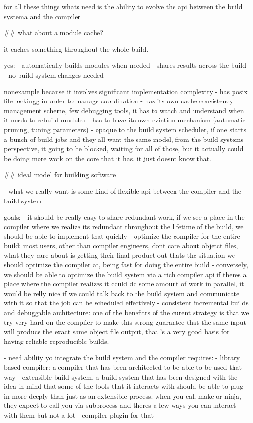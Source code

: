 \documentclass[12pt, a4paper]{report}
\begin{document}
  for all these things whats need is the ability to evolve the api between the build systema and the compiler

## what about a module cache?

  it caches something throughout the whole build.

  yes:
  - automatically builds modules when needed
  - shares results across the build
  - no build system changes needed

  nonexample because it involves significant implementation complexity
  - has posix file lockingg in order to manage coordination
  - has its own cache consistency management scheme, few debugging tools, it has to watch and understand when it needs to rebuild modules
  - has to have its own eviction mechanism (automatic pruning, tuning parameters)
  - opaque to the build system scheduler, if one starts a bunch of build jobs and they all want the same model, from the build systems perspective, it going to be blocked, waiting for all of those, but it actually could be doing more work on the core that it has, it just doesnt know that.

## ideal model for building software

  - what we really want is some kind of flexible api between the compiler and the build system

  goals:
  - it should be really easy to share redundant work, if we see a place in the compiler where we realize its redundant throughout the lifetime of the build, we should be able to implement that quickly
  - optimize the compiler for the entire build: most users, other than compiler engineers, dont care about objetct files, what they care about is getting their final product out
    thats the situation we should optimize the compiler at, being fast for doing the entire build
  - conversely, we should be able to optimize the build system via a rich compiler api
    if theres a place where the compiler realizes it could do some amount of work in parallel, it would be relly nice if we could talk back to the build system and communicate with it so that the job can be scheduled effectively
  - consistent incremental builds and debuggable architecture: one of the benefitrs of the curent strategy is that we try very hard on the compiler to make this strong guarantee that the same input will produce the exact same object file output, that 's a very good basis for having reliable reproducible builds.

  - need ability yo integrate the build system and the compiler
  requires:
  - library based compiler: a compiler that has been architected to be able to be used that way
  - extensible build system, a build system that has been designed with the idea in mind that some of the tools that it interacts with should be able to plug in more deeply than just as an extensible process.
    when you call make or ninja, they expect to call you via subprocess and theres a few ways you can interact with them but not a lot
  - compiler plugin for that
\end{document}
